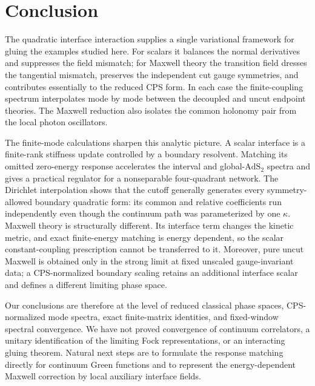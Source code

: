 \section{Conclusion}
\label{sec:conclusion}

The quadratic interface interaction supplies a single variational framework for gluing the examples studied here. For scalars it balances the normal derivatives and suppresses the field mismatch; for Maxwell theory the transition field dresses the tangential mismatch, preserves the independent cut gauge symmetries, and contributes essentially to the reduced CPS form. In each case the finite-coupling spectrum interpolates mode by mode between the decoupled and uncut endpoint theories. The Maxwell reduction also isolates the common holonomy pair from the local photon oscillators.

The finite-mode calculations sharpen this analytic picture. A scalar interface is a finite-rank stiffness update controlled by a boundary resolvent. Matching its omitted zero-energy response accelerates the interval and global-$\mathrm{AdS}_2$ spectra and gives a practical regulator for a nonseparable four-quadrant network. The Dirichlet interpolation shows that the cutoff generally generates every symmetry-allowed boundary quadratic form: its common and relative coefficients run independently even though the continuum path was parameterized by one $\kappa$. Maxwell theory is structurally different. Its interface term changes the kinetic metric, and exact finite-energy matching is energy dependent, so the scalar constant-coupling prescription cannot be transferred to it. Moreover, pure uncut Maxwell is obtained only in the strong limit at fixed unscaled gauge-invariant data; a CPS-normalized boundary scaling retains an additional interface scalar and defines a different limiting phase space.

Our conclusions are therefore at the level of reduced classical phase spaces, CPS-normalized mode spectra, exact finite-matrix identities, and fixed-window spectral convergence. We have not proved convergence of continuum correlators, a unitary identification of the limiting Fock representations, or an interacting gluing theorem. Natural next steps are to formulate the response matching directly for continuum Green functions and to represent the energy-dependent Maxwell correction by local auxiliary interface fields.
